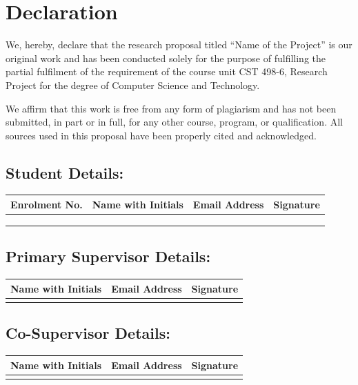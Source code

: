 \section*{Declaration}

We, hereby, declare that the research proposal titled “Name of the Project” is our original work and has been conducted solely for the purpose of fulfilling the partial fulfilment of the requirement of the course unit CST 498-6, Research Project for the degree of Computer Science and Technology.

We affirm that this work is free from any form of plagiarism and has not been submitted, in part or in full, for any other course, program, or qualification. All sources used in this proposal have been properly cited and acknowledged.

\subsection*{Student Details:}

\begin{tabularx}{\textwidth}{|X|X|l|X|}
    \hline
    \textbf{Enrolment No.} & \textbf{Name with Initials} & \textbf{Email Address} & \textbf{Signature} \\
    \hline 
     &  &  & \\
    \hline
     &  &  & \\
    \hline
     &  &  & \\
    \hline
\end{tabularx}

\subsection*{Primary Supervisor Details:}

\begin{tabularx}{\textwidth}{|X|X|X|}
    \hline
    \textbf{Name with Initials} & \textbf{Email Address} & \textbf{Signature} \\
    \hline
     &  & \\
    \hline
\end{tabularx}

\subsection*{Co-Supervisor Details:}

\begin{tabularx}{\textwidth}{|X|X|X|}
    \hline
    \textbf{Name with Initials} & \textbf{Email Address} & \textbf{Signature} \\
    \hline
    &  & \\
    \hline
\end{tabularx}

\clearpage
